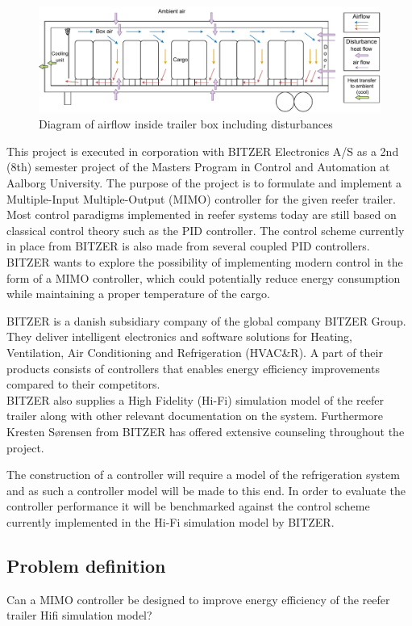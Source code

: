 \begin{figure}[h]
	\centering
	\includegraphics[width = 0.8\linewidth]{Graphics/Trailer_airflow.pdf}
	\caption{Diagram of airflow inside trailer box including disturbances}
	\label{fig:trailer_airflow}
\end{figure}

This project is executed in corporation with BITZER Electronics A/S as a 2nd (8th) semester project of the Masters Program in Control and Automation at Aalborg University. The purpose of the project is to formulate and implement a Multiple-Input Multiple-Output (MIMO) controller for the given reefer trailer. Most control paradigms implemented in reefer systems today are still based on classical control theory such as the PID controller. The control scheme currently in place from BITZER is also made from several coupled PID controllers. BITZER wants to explore the possibility of implementing modern control in the form of a MIMO controller, which could potentially reduce energy consumption while maintaining a proper temperature of the cargo.

BITZER is a danish subsidiary company of the global company BITZER Group. They deliver intelligent electronics and software solutions for Heating, Ventilation, Air Conditioning and Refrigeration (HVAC\&R). A part of their products consists of controllers that enables energy efficiency improvements compared to their competitors. \\

BITZER also supplies a High Fidelity (Hi-Fi) simulation model of the reefer trailer along with other relevant documentation on the system. Furthermore Kresten Sørensen from BITZER has offered extensive counseling throughout the project.

The construction of a controller will require a model of the refrigeration system and as such a controller model will be made to this end. In order to evaluate the controller performance it will be benchmarked against the control scheme currently implemented in the Hi-Fi simulation model by BITZER.

\subsection{Problem definition}
Can a MIMO controller be designed to improve energy efficiency of the reefer trailer Hifi simulation model?
